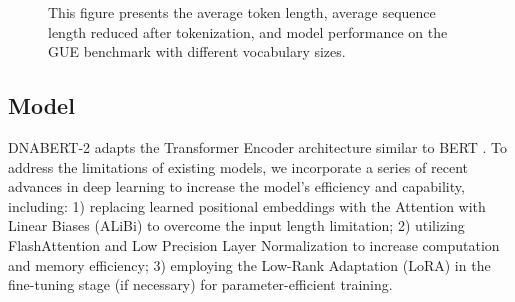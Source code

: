 \documentclass{article}
\begin{document}
		
		 


		 


\begin{figure}\centering
    \quad
    \quad
    \caption{This figure presents the average token length, average sequence length reduced after tokenization, and model performance on the GUE benchmark with different vocabulary sizes.}\label{fig:tokenizer_statistics}\end{figure}





\subsection{Model}
\label{subsec:model_architecture}
DNABERT-2 adapts the Transformer Encoder architecture similar to BERT \citep{bert}. To address the limitations of existing models, we incorporate a series of recent advances in deep learning to increase the model's efficiency and capability, including: 1) replacing learned positional embeddings with the Attention with Linear Biases (ALiBi) \citep{alibi} to overcome the input length limitation; 2) utilizing FlashAttention \citep{flashattention} and Low Precision Layer Normalization to increase computation and memory efficiency; 3) employing the Low-Rank Adaptation (LoRA) \citep{lora} in the fine-tuning stage (if necessary) for parameter-efficient training.
\end{document}
